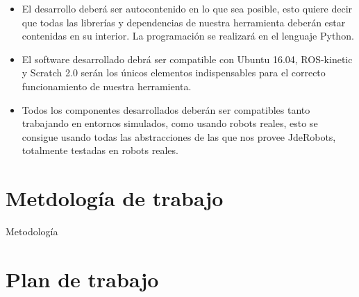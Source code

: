 \begin{itemize}
\item El desarrollo deberá ser autocontenido en lo que sea posible, esto quiere decir que todas las librerías y dependencias de nuestra herramienta deberán estar contenidas en su interior. La programación se realizará en el
lenguaje Python.
\item El software desarrollado debrá ser compatible con Ubuntu 16.04, ROS-kinetic y Scratch 2.0 serán los únicos elementos indispensables para el correcto funcionamiento de nuestra herramienta.
\item Todos los componentes desarrollados deberán ser compatibles tanto trabajando en entornos simulados, como usando robots reales, esto se consigue usando todas las abstracciones de las que nos provee JdeRobots, totalmente testadas en robots reales.
\end{itemize}



\section{Metdología de trabajo}
\label{sec:metodologia}

Metodología

\section{Plan de trabajo}
\label{sec:plan}

